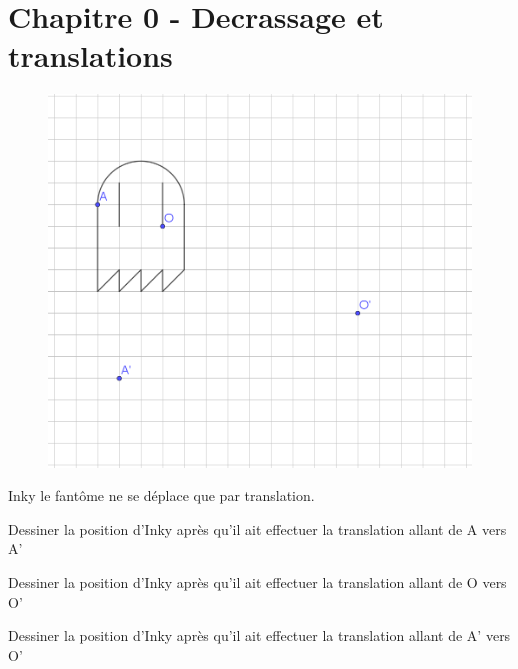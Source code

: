 \section*{Chapitre 0 - Decrassage et translations}

\begin{minipage}[t]{0.7\textwidth}
    \begin{figure}[H]
        \centering
        \includegraphics[width=\textwidth]{Images/TRnaslations.png}
    \end{figure}
\end{minipage}
\hfill
\begin{minipage}[t]{0.25\textwidth}
    \vspace{1em}
    
    Inky le fantôme ne se déplace que par translation. 
    \vspace{1em}

    \cnt Dessiner la position d'Inky après qu'il ait effectuer la translation allant de A vers A'
    \vspace{1em}


    \cnt Dessiner la position d'Inky après qu'il ait effectuer la translation allant de O vers O'
    \vspace{1em}

    \cnt Dessiner la position d'Inky après qu'il ait effectuer la translation allant de A' vers O'

\end{minipage}


